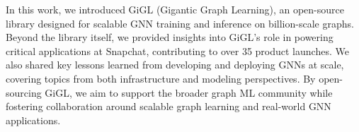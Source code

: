 

In this work, we introduced GiGL (Gigantic Graph Learning), an open-source library designed for scalable GNN training and inference on billion-scale graphs. Beyond the library itself, we provided insights into GiGL’s role in powering critical applications at Snapchat, contributing to over 35 product launches.
We also shared key lessons learned from developing and deploying GNNs at scale, covering topics from both infrastructure and modeling perspectives.
By open-sourcing GiGL, we aim to support the broader graph ML community while fostering collaboration around scalable graph learning and real-world GNN applications.

